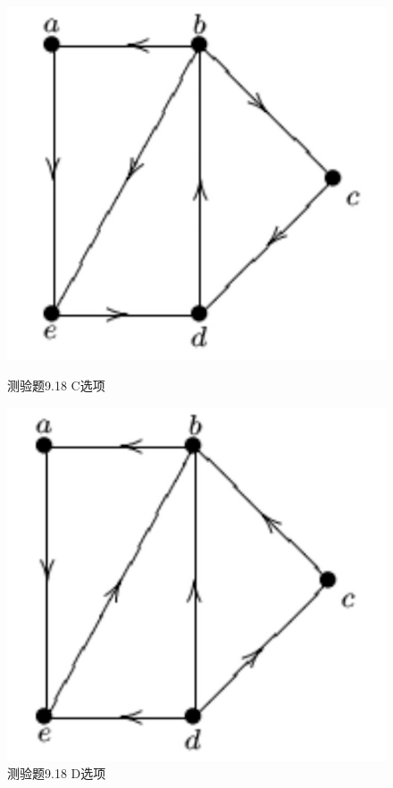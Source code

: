 \documentclass[UTF8, heading=true]{ctexart}
\begin{document}
\begin{figure}[H]
  \centering
  \begin{minipage}[t]{0.25\textwidth}
      \centering
      \includegraphics[width=1\textwidth]{9.17_3.jpg} %
      \vspace{-0.3cm}
      \caption{测验题9.18 C选项}
  \end{minipage}
  \hspace{0.2\textwidth} %
  \begin{minipage}[t]{0.25\textwidth}
      \centering
      \includegraphics[width=1\textwidth]{9.17_4.jpg} %
      \vspace{-0.3cm}
      \caption{测验题9.18 D选项}
\end{minipage}
\end{figure}
\end{document}
